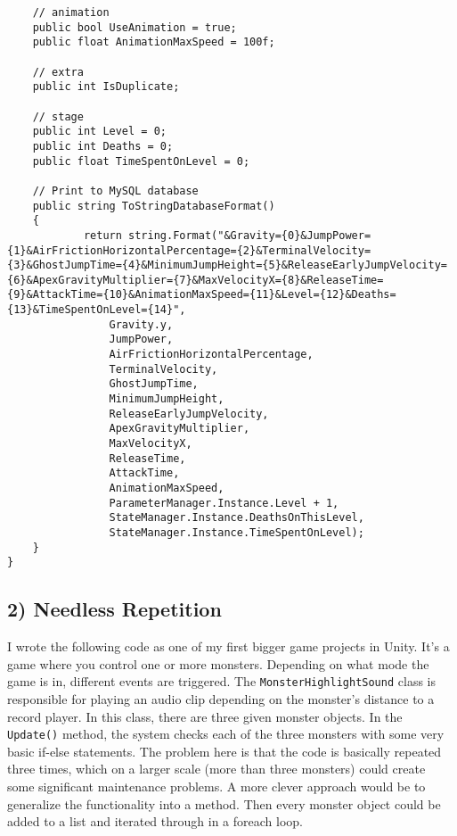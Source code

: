 \begin{lstlisting}
    // animation
    public bool UseAnimation = true;
    public float AnimationMaxSpeed = 100f;

    // extra
    public int IsDuplicate;

    // stage
    public int Level = 0;
    public int Deaths = 0;
    public float TimeSpentOnLevel = 0;

    // Print to MySQL database
    public string ToStringDatabaseFormat()
    {
            return string.Format("&Gravity={0}&JumpPower={1}&AirFrictionHorizontalPercentage={2}&TerminalVelocity={3}&GhostJumpTime={4}&MinimumJumpHeight={5}&ReleaseEarlyJumpVelocity={6}&ApexGravityMultiplier={7}&MaxVelocityX={8}&ReleaseTime={9}&AttackTime={10}&AnimationMaxSpeed={11}&Level={12}&Deaths={13}&TimeSpentOnLevel={14}",
                Gravity.y,
                JumpPower,
                AirFrictionHorizontalPercentage,
                TerminalVelocity,
                GhostJumpTime,
                MinimumJumpHeight,
                ReleaseEarlyJumpVelocity,
                ApexGravityMultiplier,
                MaxVelocityX,
                ReleaseTime,
                AttackTime,
                AnimationMaxSpeed,
                ParameterManager.Instance.Level + 1,
                StateManager.Instance.DeathsOnThisLevel,
                StateManager.Instance.TimeSpentOnLevel);
    }
}

\end{lstlisting}

\subsection*{2) Needless Repetition}
I wrote the following code as one of my first bigger game projects in Unity. It's a game where you control one or more monsters. Depending on what mode the game is in, different events are triggered. The \texttt{MonsterHighlightSound} class is responsible for playing an audio clip depending on the monster's distance to a record player. In this class, there are three given monster objects. In the \texttt{Update()} method, the system checks each of the three monsters with some very basic if-else statements. The problem here is that the code is basically repeated three times, which on a larger scale (more than three monsters) could create some significant maintenance problems. A more clever approach would be to generalize the functionality into a method. Then every monster object could be added to a list and iterated through in a foreach loop.

